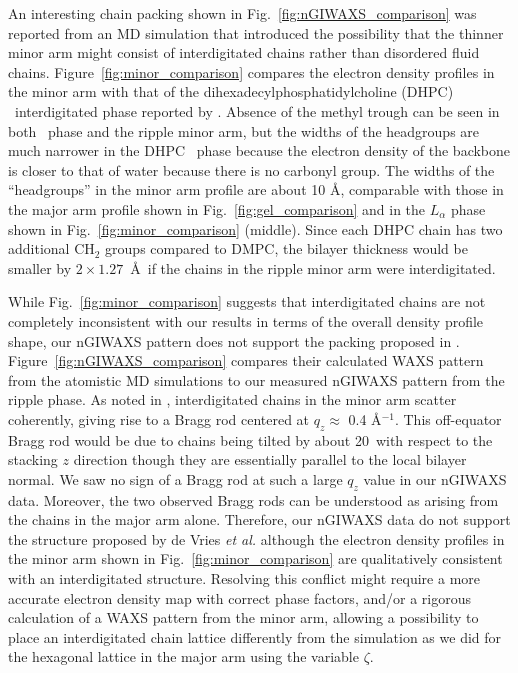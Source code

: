 
An interesting chain packing shown in Fig.~\ref{fig:nGIWAXS_comparison} 
was reported from an MD simulation \cite{ref:deVries05} that 
introduced the 
possibility that the thinner minor arm might consist of interdigitated chains 
rather than disordered fluid chains.  
Figure~\ref{fig:minor_comparison} compares the electron density
profiles in the minor arm with that of the dihexadecylphosphatidylcholine (DHPC) \LI\ interdigitated phase
reported by \cite{ref:Guler09}. Absence of the methyl trough can be seen in
both \LI\ phase and the ripple minor arm, but the widths of the
headgroups are much narrower in the DHPC \LI\ phase because the electron density
of the backbone is closer to that of water because there is no carbonyl group. The widths
of the ``headgroups'' in the minor arm profile are about 10 \AA, comparable
with those in the major arm profile shown in Fig.~\ref{fig:gel_comparison} 
and in the $L_\alpha$ phase shown in Fig.~\ref{fig:minor_comparison} (middle).
Since each DHPC chain has two additional CH$_2$ groups compared to DMPC,
the bilayer thickness would be smaller by $2\times 1.27$~\AA\
if the chains in the ripple minor arm were interdigitated.

While Fig.~\ref{fig:minor_comparison}
suggests that interdigitated chains are not completely inconsistent with 
our results in terms of the overall density profile shape, 
our nGIWAXS pattern does not support the packing proposed in 
\cite{ref:deVries05}. Figure~\ref{fig:nGIWAXS_comparison} compares
their calculated WAXS pattern from the atomistic MD simulations
to our measured nGIWAXS pattern from the ripple phase. As noted in
\cite{ref:deVries05}, interdigitated chains in the minor arm scatter
coherently, giving rise to a Bragg rod centered at $q_z \approx$ 0.4 \AA$^{-1}$.
This off-equator Bragg rod would be due to chains being tilted by about 20\textdegree\
with respect to the stacking $z$ direction though they
are essentially parallel to the local bilayer normal.
We saw no sign of a Bragg rod at such a large $q_z$ value in our nGIWAXS
data. 
Moreover, the two observed Bragg rods can be understood as arising from
the chains in the major arm alone. 
Therefore, our nGIWAXS data do not support the structure proposed by
de Vries \textit{et al.} \cite{ref:deVries05} although
the electron density profiles in the minor arm shown in 
Fig.~\ref{fig:minor_comparison} are qualitatively consistent with
an interdigitated structure.
Resolving this conflict might require a more accurate electron density
map with correct phase factors, and/or a rigorous calculation of a WAXS pattern
from the minor arm, 
allowing a possibility to place an interdigitated chain lattice differently from
the simulation as we did for the hexagonal lattice in the major arm 
using the variable $\zeta$. 


